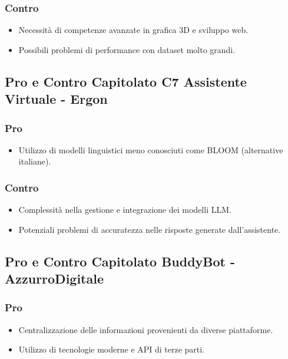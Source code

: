 \documentclass{article}
\begin{document}
\subsubsection{Contro}
\begin{itemize}
    \item Necessità di competenze avanzate in grafica 3D e sviluppo web.
    \item Possibili problemi di performance con dataset molto grandi.
\end{itemize}

\subsection{Pro e Contro Capitolato C7 Assistente Virtuale - Ergon}

\subsubsection{Pro}
\begin{itemize}
    \item Utilizzo di modelli linguistici meno conosciuti come BLOOM (alternative italiane).
\end{itemize}

\subsubsection{Contro}
\begin{itemize}
    \item Complessità nella gestione e integrazione dei modelli LLM.
    \item Potenziali problemi di accuratezza nelle risposte generate dall'assistente.
\end{itemize}

\subsection{Pro e Contro Capitolato BuddyBot - AzzurroDigitale}

\subsubsection{Pro}
\begin{itemize}
    \item Centralizzazione delle informazioni provenienti da diverse piattaforme.
    \item Utilizzo di tecnologie moderne e API di terze parti.
\end{itemize}
\end{document}

